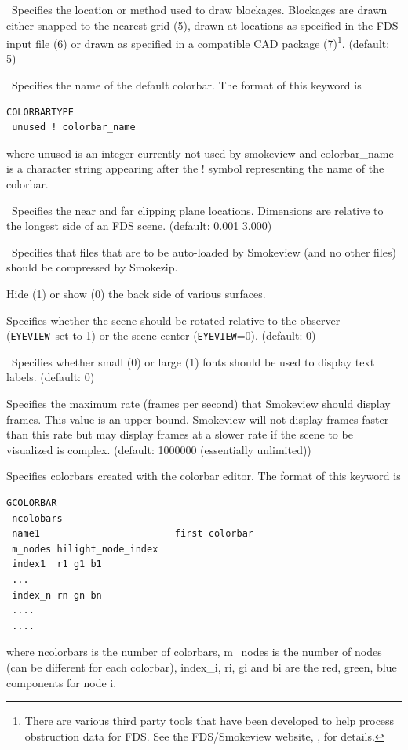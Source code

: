 \documentclass[11pt,twoside]{book}
\begin{document}
\ Specifies the location or method used to
draw blockages.  Blockages are drawn either snapped to the nearest
grid (5), drawn at locations as specified in the FDS input file
(6) or drawn as specified in a compatible CAD package (7)\footnote{There are various
third party tools that have been developed to help process obstruction data for FDS. See
the FDS/Smokeview website, , for details.}.   (default: 5)


\ Specifies the name of the default colorbar.
The format of this keyword is
\begin{lstlisting}
COLORBARTYPE
 unused ! colorbar_name
\end{lstlisting}
where unused is an integer currently not used by smokeview and colorbar\_name is
a character string appearing after the ! symbol representing the name of the colorbar.

\ Specifies the near and far clipping plane
locations.  Dimensions are relative to the longest side of
an FDS scene. (default: 0.001 3.000)


\ Specifies that files that are to be auto-loaded
by Smokeview (and no other files) should be compressed by Smokezip.

Hide (1) or show (0) the back side of various surfaces.

Specifies whether
the scene should be rotated relative to the observer ({\tt EYEVIEW}\ set to 1)
or the scene center ({\tt EYEVIEW}=0).
(default: 0)

\ Specifies whether small (0) or large (1)
fonts should be used to display text labels. (default: 0)

Specifies the maximum rate (frames per
second) that Smokeview should display frames. This value is an
upper bound.  Smokeview will not display frames faster than this
rate but may display frames at a slower rate if the scene to be
visualized is complex. (default: 1000000 (essentially unlimited))

Specifies colorbars created with the colorbar editor.
The format of this keyword is
\begin{lstlisting}
GCOLORBAR
 ncolobars
 name1                        first colorbar
 m_nodes hilight_node_index
 index1  r1 g1 b1
 ...
 index_n rn gn bn
 ....
 ....

\end{lstlisting}
where ncolorbars is the number of colorbars, m\_nodes is the number of nodes
(can be different for each colorbar), index\_i, ri, gi and bi are the red, green, blue components for
node i.
\end{document}
